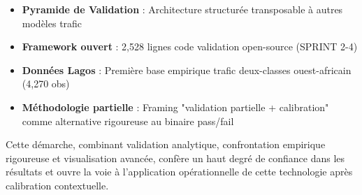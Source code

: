 \begin{itemize}
    \item \textbf{Pyramide de Validation} : Architecture structurée transposable à autres modèles trafic
    \item \textbf{Framework ouvert} : 2,528 lignes code validation open-source (SPRINT 2-4)
    \item \textbf{Données Lagos} : Première base empirique trafic deux-classes ouest-africain (4,270 obs)
    \item \textbf{Méthodologie partielle} : Framing "validation partielle + calibration" comme alternative rigoureuse au binaire pass/fail
\end{itemize}

Cette démarche, combinant validation analytique, confrontation empirique rigoureuse et visualisation avancée, confère un haut degré de confiance dans les résultats et ouvre la voie à l'application opérationnelle de cette technologie après calibration contextuelle.


